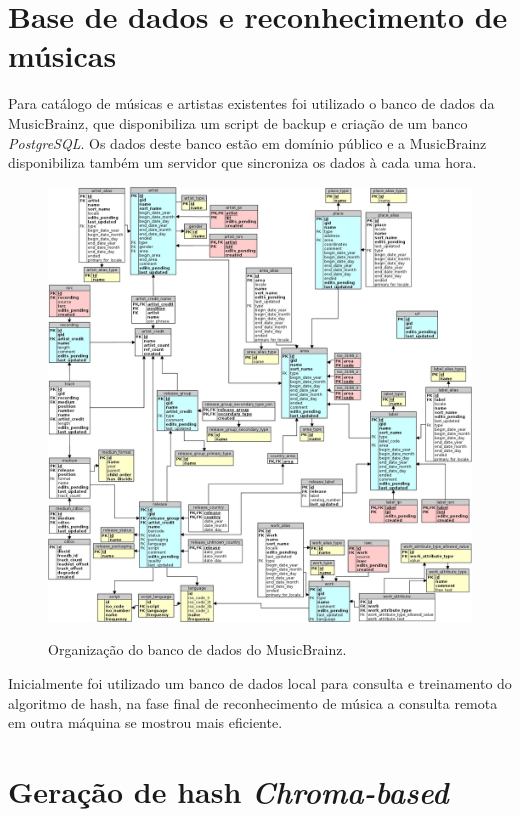 \section{Base de dados e reconhecimento de músicas}
\label{s.basedados}

Para catálogo de músicas e artistas existentes foi utilizado o banco de dados da MusicBrainz, que disponibiliza um script de backup e criação de um banco \emph{PostgreSQL}. Os dados deste banco estão em domínio público e a MusicBrainz disponibiliza também um servidor que sincroniza os dados à cada uma hora.

\begin{figure}[h]
\caption{\small Organização do banco de dados do MusicBrainz.}
\centering
\includegraphics[scale=0.40]{figs/musicbrainzschema.png}
\label{f.musicbrainz}
\end{figure}
 
 Inicialmente foi utilizado um banco de dados local para consulta e treinamento do algoritmo de hash, na fase final de reconhecimento de música a consulta remota em outra máquina se mostrou mais eficiente.
 
\section{Geração de hash \emph{Chroma-based}}
\label{s.hashchroma}

